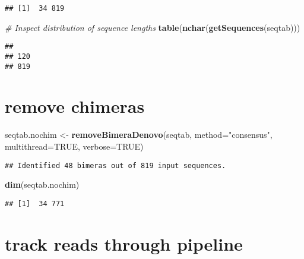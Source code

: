 \documentclass[
]{article}
\newenvironment{Shaded}{\begin{snugshade}}{\end{snugshade}}
\newcommand{\AttributeTok}[1]{\textcolor[rgb]{0.13,0.29,0.53}{#1}}
\newcommand{\CommentTok}[1]{\textcolor[rgb]{0.56,0.35,0.01}{\textit{#1}}}
\newcommand{\ConstantTok}[1]{\textcolor[rgb]{0.56,0.35,0.01}{#1}}
\newcommand{\FunctionTok}[1]{\textcolor[rgb]{0.13,0.29,0.53}{\textbf{#1}}}
\newcommand{\NormalTok}[1]{#1}
\newcommand{\OtherTok}[1]{\textcolor[rgb]{0.56,0.35,0.01}{#1}}
\newcommand{\StringTok}[1]{\textcolor[rgb]{0.31,0.60,0.02}{#1}}
\begin{document}
\begin{verbatim}
## [1]  34 819
\end{verbatim}

\begin{Shaded}
\begin{Highlighting}[]
\CommentTok{\# Inspect distribution of sequence lengths}
\FunctionTok{table}\NormalTok{(}\FunctionTok{nchar}\NormalTok{(}\FunctionTok{getSequences}\NormalTok{(seqtab)))}
\end{Highlighting}
\end{Shaded}

\begin{verbatim}
## 
## 120 
## 819
\end{verbatim}

\hypertarget{remove-chimeras}{%
\section{remove chimeras}\label{remove-chimeras}}

\begin{Shaded}
\begin{Highlighting}[]
\NormalTok{seqtab.nochim }\OtherTok{\textless{}{-}} \FunctionTok{removeBimeraDenovo}\NormalTok{(seqtab, }\AttributeTok{method=}\StringTok{"consensus"}\NormalTok{, }\AttributeTok{multithread=}\ConstantTok{TRUE}\NormalTok{, }\AttributeTok{verbose=}\ConstantTok{TRUE}\NormalTok{)}
\end{Highlighting}
\end{Shaded}

\begin{verbatim}
## Identified 48 bimeras out of 819 input sequences.
\end{verbatim}

\begin{Shaded}
\begin{Highlighting}[]
\FunctionTok{dim}\NormalTok{(seqtab.nochim)}
\end{Highlighting}
\end{Shaded}

\begin{verbatim}
## [1]  34 771
\end{verbatim}

\hypertarget{track-reads-through-pipeline}{%
\section{track reads through
pipeline}\label{track-reads-through-pipeline}}
\end{document}
